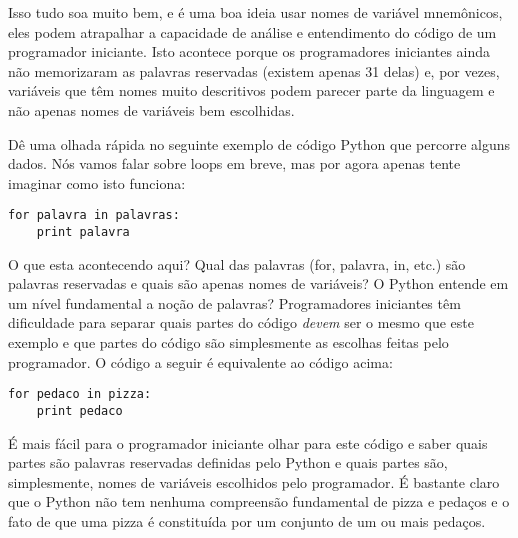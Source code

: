 Isso tudo soa muito bem, e é uma boa ideia usar nomes de variável mnemônicos, 
eles podem atrapalhar a capacidade de análise e 
entendimento do código de um programador iniciante. Isto acontece porque os programadores iniciantes 
ainda não memorizaram as palavras reservadas (existem apenas 31 delas) e, por vezes, 
variáveis que têm nomes muito descritivos podem parecer 
parte da linguagem e não apenas nomes de variáveis bem escolhidas.

Dê uma olhada rápida no seguinte exemplo de código Python que percorre alguns dados. 
Nós vamos falar sobre loops em breve, mas por agora apenas tente imaginar como isto funciona:

\beforeverb
\begin{verbatim}
for palavra in palavras:
    print palavra
\end{verbatim}
\afterverb
%
O que esta acontecendo aqui? Qual das palavras (for, palavra, in, etc.) são palavras reservadas 
e quais são apenas nomes de variáveis? O Python entende em um nível fundamental 
a noção de palavras? Programadores iniciantes têm 
dificuldade para separar quais partes 
do código \emph{devem} ser o mesmo que este exemplo e que partes do código são simplesmente 
as escolhas feitas pelo programador.
%
O código a seguir é equivalente ao código acima:
%


\beforeverb
\begin{verbatim}
for pedaco in pizza:
    print pedaco
\end{verbatim}
\afterverb
%
É mais fácil para o programador iniciante olhar para este código e saber quais 
partes são palavras reservadas definidas pelo Python e quais partes são, simplesmente, nomes de 
variáveis escolhidos pelo programador. É bastante claro que o Python não tem nenhuma compreensão 
fundamental de pizza e pedaços e o fato de que uma pizza é constituída por um conjunto 
de um ou mais pedaços.

